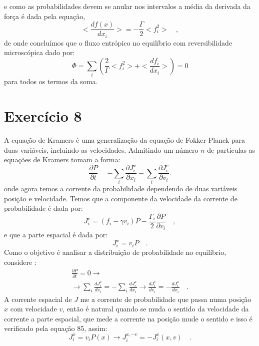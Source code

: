 \documentclass[12pt]{article}
\begin{document}
e como as probabilidades devem se anular nos intervalos a média da derivada da força é dada pela equação,
\begin{equation}
<\frac{df(x)}{dx_i}> =-\frac{\Gamma}{2}<f_i^2> \quad,
\end{equation}
de onde concluímos que o fluxo entrópico no equilíbrio com reversibilidade microscópica dado por:
\begin{equation}
\Phi = \sum\limits_i \left( \frac{2}{\Gamma}<f^2_i> + <\frac{df_i}{dx_i}>\right) = 0
\end{equation}
para todos os termos da soma.

\section*{Exercício 8}
A equação de Kramers é uma generalização da equação de Fokker-Planck para duas variáveis, incluindo as velocidades. Admitindo um número $n$ de partículas as equações de Kramers tomam a forma:
\begin{equation}
\frac{\partial P}{\partial t} = -\sum_i \frac{\partial J^x_i}{\partial x_i} -\sum_i \frac{\partial J^v_i}{\partial v_i}. 
\end{equation}
onde agora temos a corrente da probabilidade dependendo de duas variáveis posição e velocidade. 
Temos que a componente da velocidade da corrente de probabilidade é dada por:
\begin{equation}
J_i^v = (f_i - \gamma v_i)P - \frac{\Gamma_i}{2}\frac{\partial P}{\partial v_i} \quad ,
\end{equation}
e que a parte espacial é dada por:
\begin{equation}
J_i^x = v_iP \quad .
\end{equation}
Como o objetivo é analisar a distribuição de probabilidade no equilíbrio, considere :
\begin{equation}
\begin{split}
\frac{\partial P}{\partial t} = 0 \rightarrow\\
\rightarrow \sum_i\frac{dJ_i^v}{dv_i} = -\sum_i\frac{dJ_i^x}{dx_i} \rightarrow \frac{dJ_i^v}{dv_i} = -\frac{dJ_i^x}{dx_i} \quad.
\end{split}
\end{equation}
A corrente espacial de $J$ me a corrente de probabilidade que passa numa posição $x$ com velocidade $v$, então é natural quando se muda o sentido da velocidade da corrente a parte espacial, que mede a corrente na posição mude o sentido e isso é verificado pela equação 85, assim:
\begin{equation}
J_i^x = v_iP(x) \rightarrow J_i^{x, -v} = -J_i^x(x, v) \quad. 
\end{equation}
\end{document}
